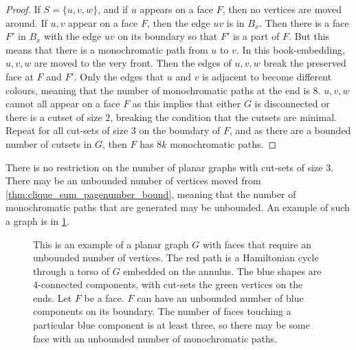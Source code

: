 \begin{proof}
	If $S = \{u,v,w\}$, and if $u$ appears on a face $F$, then no vertices are moved around. If $u,v$ appear on a face $F$, then the edge $uv$ is in $B_x$. Then there is a face $F'$ in $B_x$ with the edge $uv$ on its boundary so that $F'$ is a part of $F$. But this means that there is a monochromatic path from $u$ to $v$. In this book-embedding, $u,v,w$ are moved to the very front. Then the edges of $u,v,w$ break the preserved face at $F$ and $F'$. Only the edges that $u$ and $v$ is adjacent to become different colours, meaning that the number of monochromatic paths at the end is $8$. 
	$u,v,w$ cannot all appear on a face $F$ as this implies that either $G$ is disconnected or there is a cutset of size $2$, breaking the condition that the cutsets are minimal. 
	Repeat for all cut-sets of size $3$ on the boundary of $F$, and as there are a bounded number of cutsets in $G$, then $F$ has $8k$ monochromatic paths.

\end{proof}	
There is no restriction on the number of planar graphs with cut-sets of size $3$.  There may be an unbounded number of vertices moved from \cref{thm:clique_sum_pagenumber_bound}, meaning that the number of monochromatic paths that are generated may be unbounded. An example of such a graph is in \cref{fig:moved_vertices}.


\begin{figure}[h!]
	\centering
	
	\caption[Counterexample to bounded number of moved vertices]{This is an example of a planar graph $G$ with faces that require an unbounded number of vertices. The red path is a Hamiltonian cycle through a torso of $G$ embedded on the annulus. The blue shapes are $4$-connected components, with cut-sets the green vertices on the ends. Let $F$ be a face. $F$ can have an unbounded number of blue components on its boundary. The number of faces touching a particular blue component is at least three, so there may be some face with an unbounded number of monochromatic paths.}\label{fig:moved_vertices}
\end{figure}
